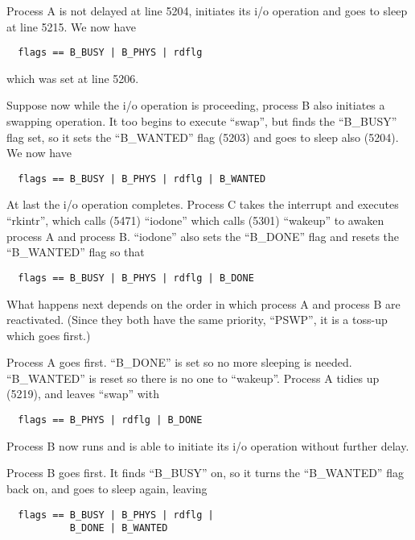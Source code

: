 \noindent Process A is not delayed at line 5204,
initiates its i/o operation and goes to
sleep at line 5215. We now have

\begin{verbatim}
  flags == B_BUSY | B_PHYS | rdflg
\end{verbatim}

\noindent which was set at line 5206.


Suppose now while the i/o operation is
proceeding, process B also initiates a
swapping operation. It too begins to
execute ``swap'', but finds the ``B\_BUSY''
flag set, so it sets the ``B\_WANTED''
flag (5203) and goes to sleep also
(5204). We now have

\begin{verbatim}
  flags == B_BUSY | B_PHYS | rdflg | B_WANTED
\end{verbatim}

At last the i/o operation completes.
Process C takes the interrupt and executes ``rkintr'', which calls (5471)
``iodone'' which calls (5301) ``wakeup'' to
awaken process A and process B.
``iodone'' also sets the ``B\_DONE'' flag
and resets the ``B\_WANTED'' flag so that

\begin{verbatim}
  flags == B_BUSY | B_PHYS | rdflg | B_DONE
\end{verbatim}

What happens next depends on the order
in which process A and process B are
reactivated. (Since they both have the
same priority, ``PSWP'', it is a toss-up
which goes first.)

\bd
\item[Case (a):] Process A goes first.
``B\_DONE'' is set so no more sleeping is
needed. ``B\_WANTED'' is reset so there is
no one to ``wakeup''. Process A tidies up
(5219), and leaves ``swap'' with

\begin{verbatim}
  flags == B_PHYS | rdflg | B_DONE
\end{verbatim}

Process B now runs and is able to initiate its i/o operation without further
delay.

\item[Case (b):] Process B goes first. It
 finds ``B\_BUSY'' on, so it turns the
 ``B\_WANTED'' flag back on, and goes to
 sleep again, leaving

\begin{verbatim}
  flags == B_BUSY | B_PHYS | rdflg |
           B_DONE | B_WANTED
\end{verbatim}

